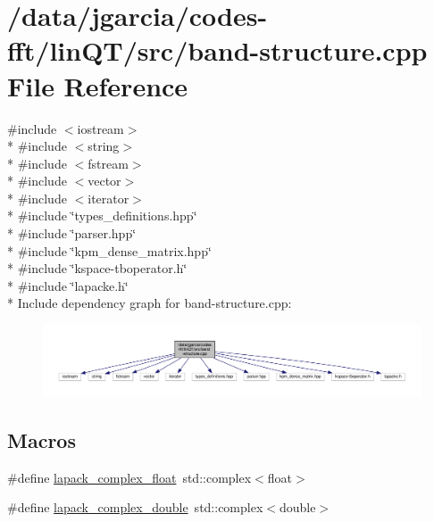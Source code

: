 \hypertarget{band-structure_8cpp}{}\section{/data/jgarcia/codes-\/fft/lin\+Q\+T/src/band-\/structure.cpp File Reference}
\label{band-structure_8cpp}
{\ttfamily \#include $<$iostream$>$}\\*
{\ttfamily \#include $<$string$>$}\\*
{\ttfamily \#include $<$fstream$>$}\\*
{\ttfamily \#include $<$vector$>$}\\*
{\ttfamily \#include $<$iterator$>$}\\*
{\ttfamily \#include \char`\"{}types\+\_\+definitions.\+hpp\char`\"{}}\\*
{\ttfamily \#include \char`\"{}parser.\+hpp\char`\"{}}\\*
{\ttfamily \#include \char`\"{}kpm\+\_\+dense\+\_\+matrix.\+hpp\char`\"{}}\\*
{\ttfamily \#include \char`\"{}kspace-\/tboperator.\+h\char`\"{}}\\*
{\ttfamily \#include \char`\"{}lapacke.\+h\char`\"{}}\\*
Include dependency graph for band-\/structure.cpp\+:
\nopagebreak
\begin{figure}[H]
\begin{center}
\leavevmode
\includegraphics[width=350pt]{band-structure_8cpp__incl}
\end{center}
\end{figure}
\subsection*{Macros}
\begin{DoxyCompactItemize}
\item 
\#define \hyperlink{band-structure_8cpp_ae50371d798dfe647fd2db629ba774a8a}{lapack\+\_\+complex\+\_\+float}~std\+::complex$<$float$>$
\item 
\#define \hyperlink{band-structure_8cpp_ad3fccfa336e6375f856b0ea83fb28343}{lapack\+\_\+complex\+\_\+double}~std\+::complex$<$double$>$
\end{DoxyCompactItemize}
